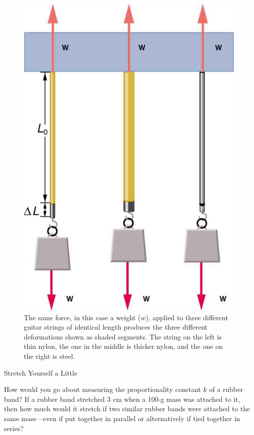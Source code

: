 \documentclass[
]{book}
\newenvironment{note}{}{}
\begin{document}
\begin{figure}
\hypertarget{import-auto-id1165296232089}{%
\centering
\includegraphics{images/Figure_06_03_02a.jpg}
\caption{The same force, in this case a weight (\(w{}\)), applied to three
different guitar strings of identical length produces the three
different deformations shown as shaded segments. The string on the left
is thin nylon, the one in the middle is thicker nylon, and the one on
the right is
steel.}\label{import-auto-id1165296232089}
}
\end{figure}

\hypertarget{fs-id1165298669085}{}
\begin{note}

Stretch Yourself a Little

How would you go about measuring the proportionality constant \(k{}\) of a
rubber band? If a rubber band stretched 3 cm when a 100-g mass was
attached to it, then how much would it stretch if two similar rubber
bands were attached to the same mass---even if put together in parallel
or alternatively if tied together in series?

\end{note}
\end{document}
